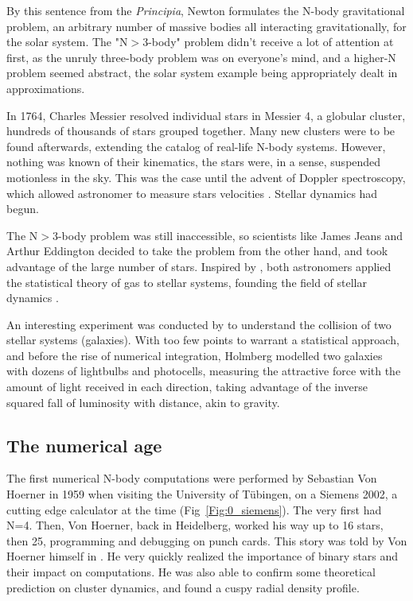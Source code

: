 By this sentence from the \textit{Principia}, Newton formulates the N-body gravitational problem, an arbitrary number of massive bodies all interacting gravitationally, for the solar system. The "N$>$3-body" problem didn't receive a lot of attention at first, as the unruly three-body problem was on everyone's mind, and a higher-N problem seemed abstract, the solar system example being appropriately dealt in approximations.

In 1764, Charles Messier resolved individual stars in Messier 4, a globular cluster, hundreds of thousands of stars grouped together. Many new clusters were to be found afterwards, extending the catalog of real-life N-body systems. However, nothing was known of their kinematics, the stars were, in a sense, suspended motionless in the sky. This was the case until the advent of Doppler spectroscopy, which allowed astronomer to measure stars velocities \citep{Doppler1842}. Stellar dynamics had begun.

The N$>$3-body problem was still inaccessible, so scientists like James Jeans and Arthur Eddington decided to take the problem from the other hand, and took advantage of the large number of stars. Inspired by \cite{Poincare1906}, both astronomers applied the statistical theory of gas to stellar systems, founding the field of stellar dynamics \citep{Jeans1916,Eddington1916}.

An interesting experiment was conducted by \cite{Holmberg1941} to understand the collision of two stellar systems (galaxies). With too few points to warrant a statistical approach, and before the rise of numerical integration, Holmberg modelled two galaxies with dozens of lightbulbs and photocells, measuring the attractive force with the amount of light received in each direction, taking advantage of the inverse squared fall of luminosity with distance, akin to gravity.

\subsection*{The numerical age}

The first numerical N-body computations were performed by Sebastian Von Hoerner in 1959 when visiting the University of T\"ubingen, on a Siemens 2002, a cutting edge calculator at the time (Fig~\ref{Fig:0_siemens}). The very first had N=4. Then, Von Hoerner, back in Heidelberg, worked his way up to 16 stars, then 25, programming and debugging on punch cards. This story was told by Von Hoerner himself in \cite{VonHoerner2001}. He very quickly realized the importance of binary stars and their impact on computations. He was also able to confirm some theoretical prediction on cluster dynamics, and found a cuspy radial density profile\citep{VonHoerner1960,VonHoerner1963}.

